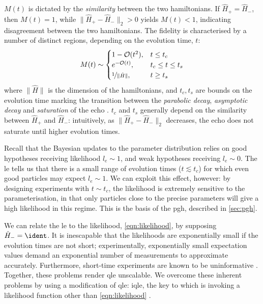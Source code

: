 $M(t)$ is dictated by the \emph{similarity} between the two \glspl{hamiltonian}.
If $\hat{H}_{+} = \hat{H}_{-}$, then $M(t) = 1$, while $\|\hat{H}_{+} - \hat{H}_{-} \|_2 > 0$ yields $M(t) < 1$, 
    indicating disagreement between the two \glspl{hamiltonian}. 
The fidelity is characterised by a number of distinct regions, depending on the evolution time, $t$:
\begin{align}
    \label{eqn:loschmidt_ranges}
    M(t) \sim 
    \begin{cases}
        1 - \mathcal{O}(t^2),  & t \leq t_c \\
        e^{-\mathcal{O}(t)}, & t_c \leq t \leq t_{s} \\
        \nicefrac{1}{\| \hat{H} \|}, & t \geq t_{s}
    \end{cases}
\end{align}
    where $\|\hat{H}\|$ is the dimension of the \glspl{hamiltonian}, and $t_c, t_{s}$ are bounds on the evolution time marking the transition between the 
    \emph{parabolic decay}, \emph{asymptotic decay} and \emph{saturation} of the echo \cite{goussev2012loschmidt}. 
$t_c$ and $t_s$ generally depend on the similarity between $\hat{H}_+$ and $\hat{H}_{-}$: 
    intuitively, as $\|\hat{H}_+ - \hat{H}_{-}\|_2$ decreases, the echo does not saturate until higher evolution times. 
\par 

Recall that the Bayesian updates to the parameter distribution relies on good hypotheses receiving likelihood $l_e \sim 1$,
    and weak hypotheses receiving $l_e \sim 0$. 
The \gls{le} tells us that there is a small range of evolution times ($t \lesssim t_c$) for which even good \glspl{particle} may expect $l_e \sim 1$.
We can exploit this effect, however: 
    by designing \glspl{experiment} with $t \sim t_c$, the likelihood is extremely sensitive to the parameterisation, 
    in that only \glspl{particle} close to the precise parameters will give a high likelihood in this regime. 
This is the basis of the \acrlong{pgh}, described in \cref{sec:pgh}. 
\par 

We can relate the \gls{le} to the likelihood, \cref{eqn:likelihood}, by supposing $\hat{H}_{-} = \ident$. 
It is inescapable that the \glspl{likelihood} are exponentially small if the evolution times are not short;
    experimentally, exponentially small \glspl{expectation value} demand an exponential number of measurements to approximate accurately.
Furthermore, short-time \glspl{experiment} are known to be uninformative \cite{wiebe2014qhlpra, wiebe2015quantum}.
Together, these problems render \gls{qle} unscalable.
We overcome these inherent problems by using a modification of \gls{qle}: \gls{iqle},
    the key to which is invoking a \gls{likelihood} function other than \cref{eqn:likelihood} \cite{Wiebe:2014qhl}.
    
